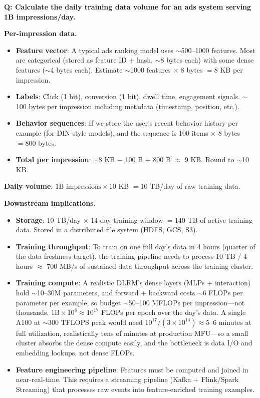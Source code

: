 \begin{interviewq}
\textbf{Q: Calculate the daily training data volume for an ads system serving 1B impressions/day.}

 \quad {} \quad \badgefreq{\freqlow}

\stronganswer

\textbf{Per-impression data.}
\begin{itemize}
    \item \textbf{Feature vector}: A typical ads ranking model uses $\sim$500--1000 features. Most are categorical (stored as feature ID + hash, $\sim$8 bytes each) with some dense features ($\sim$4 bytes each). Estimate $\sim$1000 features $\times$ 8 bytes $= 8$ KB per impression.
    \item \textbf{Labels}: Click (1 bit), conversion (1 bit), dwell time, engagement signals. $\sim$100 bytes per impression including metadata (timestamp, position, etc.).
    \item \textbf{Behavior sequences}: If we store the user's recent behavior history per example (for DIN-style models), and the sequence is 100 items $\times$ 8 bytes $= 800$ bytes.
    \item \textbf{Total per impression}: $\sim$8 KB + 100 B + 800 B $\approx$ 9 KB. Round to $\sim$10 KB.
\end{itemize}

\textbf{Daily volume.} $1\text{B impressions} \times 10$ KB $= 10$ TB/day of raw training data.

\textbf{Downstream implications.}
\begin{itemize}
    \item \textbf{Storage}: 10 TB/day $\times$ 14-day training window $= 140$ TB of active training data. Stored in a distributed file system (HDFS, GCS, S3).
    \item \textbf{Training throughput}: To train on one full day's data in 4 hours (quarter of the data freshness target), the training pipeline needs to process $10$ TB / 4 hours $\approx$ 700 MB/s of sustained data throughput across the training cluster.
    \item \textbf{Training compute}: A realistic DLRM's dense layers (MLPs + interaction) hold $\sim$10--30M parameters, and forward + backward costs $\sim$6 FLOPs per parameter per example, so budget $\sim$50--100 MFLOPs per impression---not thousands. $1\text{B} \times 10^{8} \approx 10^{17}$ FLOPs per epoch over the day's data. A single A100 at $\sim$300 TFLOPS peak would need $10^{17} / (3 \times 10^{14}) \approx 5$--$6$ minutes at full utilization, realistically tens of minutes at production MFU---so a small cluster absorbs the dense compute easily, and the bottleneck is data I/O and embedding lookups, not dense FLOPs.
    \item \textbf{Feature engineering pipeline}: Features must be computed and joined in near-real-time. This requires a streaming pipeline (Kafka + Flink/Spark Streaming) that processes raw events into feature-enriched training examples.
\end{itemize}


\end{interviewq}

